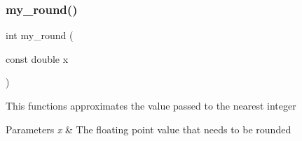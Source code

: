 \subsubsection{my\+\_\+round()}
{\footnotesize\ttfamily int my\+\_\+round (\begin{DoxyParamCaption}\item[{const double}]{x }\end{DoxyParamCaption})}

This functions approximates the value passed to the nearest integer


\begin{DoxyParams}{Parameters}
{\em x} & The floating point value that needs to be rounded \\
\hline
\end{DoxyParams}

